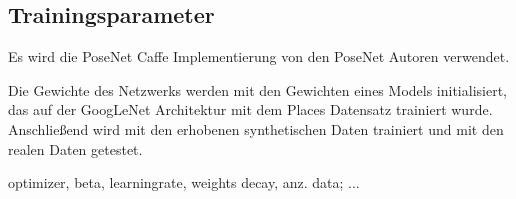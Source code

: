 \subsection{Trainingsparameter}
Es wird die PoseNet Caffe Implementierung \cite{jiaCaffeConvolutionalArchitecture2014} von den PoseNet Autoren  \citet{kendallPoseNetConvolutionalNetwork2015} verwendet. 


Die Gewichte des Netzwerks werden mit den Gewichten eines Models initialisiert, das auf der GoogLeNet Architektur mit dem Places Datensatz \cite{zhouLearningDeepFeatures2014} trainiert wurde. Anschließend wird mit den erhobenen synthetischen Daten trainiert und mit den realen Daten getestet.

optimizer, beta,
learningrate,
weights decay, anz. data; ...